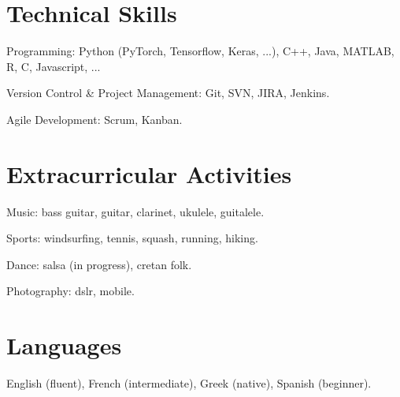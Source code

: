 \documentclass[letterpaper]{article}
\renewenvironment{itemize}{
  \begin{list}{}{
    \setlength{\leftmargin}{1.5em}
  }
}{
  \end{list}
}
\begin{document}
\section*{Technical Skills}
\begin{itemize}
    \item Programming: Python (PyTorch, Tensorflow, Keras, ...), C++, Java, MATLAB, R, C, Javascript, ...
    \item Version Control \& Project Management: Git, SVN, JIRA, Jenkins.
    \item Agile Development: Scrum, Kanban.
\end{itemize}

\section*{Extracurricular Activities}
\begin{itemize}
    \item Music: bass guitar, guitar, clarinet, ukulele, guitalele.
    \item Sports: windsurfing, tennis, squash, running, hiking.
    \item Dance: salsa (in progress), cretan folk.
    \item Photography: dslr, mobile.
\end{itemize}

\section*{Languages}
\begin{itemize}
    \item English (fluent), French (intermediate), Greek (native), Spanish (beginner).
\end{itemize}
\end{document}
